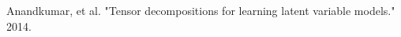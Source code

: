\documentclass[preview]{standalone}
\begin{document}
\begin{center}
Anandkumar, et al. "Tensor decompositions for learning latent variable models." 2014.
\end{center}
\end{document}

